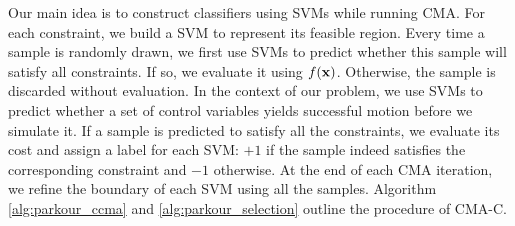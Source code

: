 



Our main idea is to construct classifiers using SVMs while running
CMA. For each constraint, we build a SVM to represent its feasible
region. Every time a sample is randomly drawn, we first use SVMs to
predict whether this sample will satisfy all constraints. If so, we
evaluate it using $f(\mathbf{x})$. Otherwise, the sample is discarded
without evaluation. In the context of our problem, we use SVMs to
predict whether a set of control variables yields successful motion
before we simulate it. If a sample is predicted to satisfy all the
constraints, we evaluate its cost and assign a label for each SVM:
$+1$ if the sample indeed satisfies the corresponding constraint and
$-1$ otherwise. At the end of each CMA iteration, we refine the
boundary of each SVM using all the samples. Algorithm \ref{alg:parkour_ccma}
and \ref{alg:parkour_selection} outline the procedure of CMA-C.

